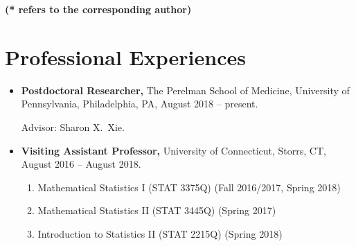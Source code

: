 \documentclass[margin]{res}
\begin{document}
\begin{resume}

{\bf (* refers to the corresponding author)}

\section{Professional Experiences}
\begin{itemize}
	\item {\bf Postdoctoral Researcher,} The Perelman School of 
	Medicine, University of Pennsylvania, Philadelphia, PA, August 
	2018 -- present.
	
	Advisor: Sharon X.\ Xie.
	\item {\bf Visiting Assistant Professor,} University of Connecticut, Storrs, CT, August 2016 -- August 2018.
	\begin{enumerate}
		\item Mathematical Statistics {\rm I} (STAT 3375Q) (Fall 2016/2017, Spring 2018)
		\item Mathematical Statistics {\rm II} (STAT 3445Q) (Spring 2017)
		\item Introduction to Statistics {\rm II} (STAT 2215Q) (Spring 2018)
	\end{enumerate}
	

\end{itemize}
\end{resume}
\end{document}
